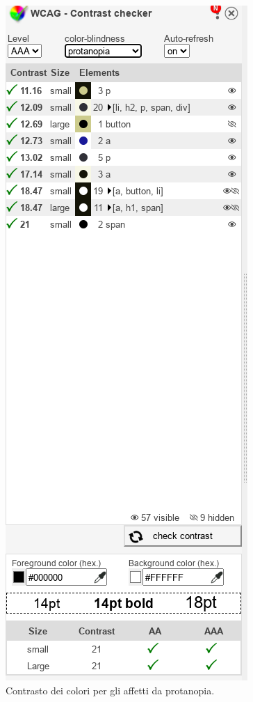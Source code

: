 \documentclass{template}
\begin{document}
	\begin{figure}[H]
		\centering
		\includegraphics[scale=0.6]{src/contrasti/protanopia.png}
		\caption{Contrasto dei colori per gli affetti da protanopia.}
	\end{figure}
	\pagebreak
\end{document}
